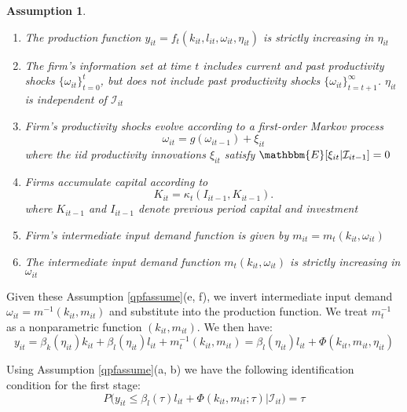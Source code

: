 \documentclass[11pt]{article}
\newtheorem{assump}{Assumption}[section]
\begin{document}
\begin{assump} \label{qpfassume}
~
\begin{enumerate}[label=(\alph*)]
	\item The production function $y_{it}=f_{t}(k_{it}, l_{it}, \omega_{it}, \eta_{it})$ is strictly increasing in $\eta_{it}$
	\item The firm's information set at time $t$ includes current and past productivity shocks $\{\omega_{it}\}_{t=0}^{t}$, but does not include past productivity shocks $\{\omega_{it}\}_{t=t+1}^{\infty}$. $\eta_{it}$ is independent of $\mathcal{I}_{it}$
	\item Firm's productivity shocks evolve according to a first-order Markov process
	\begin{equation}
	\omega_{it}=g(\omega_{it-1})+\xi_{it}
	\end{equation}
	where the iid productivity innovations $\xi_{it}$ satisfy $\mathbbm{E}[\xi_{it}|\mathcal{I}_{it-1}]=0$
	\item Firms accumulate capital according to
	\begin{equation}
	    K_{it}=\kappa_{t}(I_{it-1}, K_{it-1}).
	\end{equation}
	where $K_{it-1}$ and $I_{it-1}$ denote previous period capital and investment
	\item Firm's intermediate input demand function is given by $m_{it}=m_{t}(k_{it}, \omega_{it})$
	\item The intermediate input demand function $m_{t}(k_{it}, \omega_{it})$ is strictly increasing in $\omega_{it}$
\end{enumerate}
\end{assump}

Given these Assumption \eqref{qpfassume}(e, f), we invert intermediate input demand $\omega_{it}=m^{-1}(k_{it}, m_{it})$ and substitute into the production function. We treat $m_{t}^{-1}$ as a nonparametric function $(k_{it}, m_{it})$. We then have:
\begin{equation} \label{qpf1st}
y_{it}=\beta_{k}(\eta_{it})k_{it}+\beta_{l}(\eta_{it})l_{it}+m_{t}^{-1}(k_{it}, m_{it})=\beta_{l}(\eta_{it})l_{it}+\Phi(k_{it}, m_{it}, \eta_{it})
\end{equation}

Using Assumption \eqref{qpfassume}(a, b) we have the following identification condition for the first stage:
\begin{equation} \label{1ststageident}
	P\big(y_{it}\leq \beta_{l}(\tau)l_{it}+\Phi(k_{it}, m_{it}; \tau)\big|\mathcal{I}_{it})=\tau
\end{equation}
\end{document}
